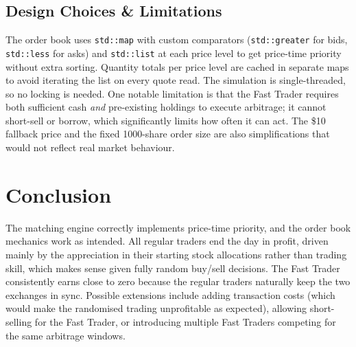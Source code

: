 \documentclass[11pt, a4paper]{article}
\begin{document}
\subsection{Design Choices \& Limitations}

The order book uses \texttt{std::map} with custom comparators (\texttt{std::greater} for bids, \texttt{std::less} for asks) and \texttt{std::list} at each price level to get price-time priority without extra sorting. Quantity totals per price level are cached in separate maps to avoid iterating the list on every quote read. The simulation is single-threaded, so no locking is needed. One notable limitation is that the Fast Trader requires both sufficient cash \emph{and} pre-existing holdings to execute arbitrage; it cannot short-sell or borrow, which significantly limits how often it can act. The \$10 fallback price and the fixed 1000-share order size are also simplifications that would not reflect real market behaviour.

\section{Conclusion}

The matching engine correctly implements price-time priority, and the order book mechanics work as intended. All regular traders end the day in profit, driven mainly by the appreciation in their starting stock allocations rather than trading skill, which makes sense given fully random buy/sell decisions. The Fast Trader consistently earns close to zero because the regular traders naturally keep the two exchanges in sync. Possible extensions include adding transaction costs (which would make the randomised trading unprofitable as expected), allowing short-selling for the Fast Trader, or introducing multiple Fast Traders competing for the same arbitrage windows.
\end{document}

